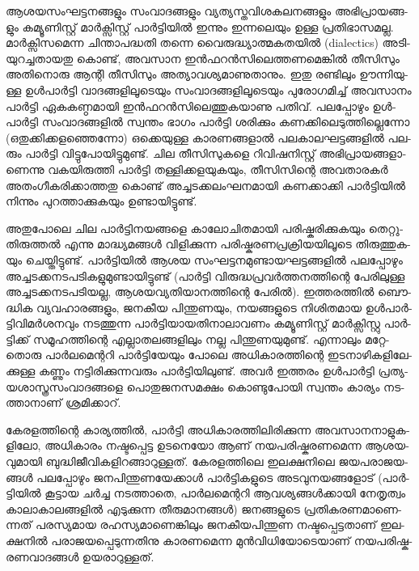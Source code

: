 \vskip 2pt

­ആ­ശ­യ­സം­ഘ­ട്ട­ന­ങ്ങ­ളും സം­വാ­ദ­ങ്ങ­ളും വ്യ­ത്യ­സ്ത­വി­ശ­ക­ല­ന­ങ്ങ­ളും അഭി­പ്രാ­യ­ങ്ങ­ളും കമ്യൂ­ണി­സ്റ്റ് മാര്‍­ക്സി­സ്റ്റ് പാര്‍­ട്ടി­യില്‍ 
ഇന്നും ഇന്ന­ലെ­യും ഉള്ള പ്ര­തി­ഭാ­സ­മ­ല്ല. മാര്‍­ക്സി­സ­മെ­ന്ന ചി­ന്താ­പ­ദ്ധ­തി തന്നെ വൈ­രു­ദ്ധ്യാ­ത്മ­ക­തയില്‍ (dialectics)­ 
അടി­യു­റ­ച്ച­താ­യ­തു കൊ­ണ്ട്, അവ­സാന ഇന്‍­ഫ­റന്‍­സി­ലെ­ത്ത­ണ­മെ­ങ്കില്‍ തീ­സി­സും അതി­നൊ­രു ആന്റി തീ­സി­സും 
അത്യാ­വ­ശ്യ­മാ­ണു­താ­നും. ഇതു രണ്ടി­ലും ഊന്നി­യു­ള്ള ഉള്‍­പാര്‍­ട്ടി വാ­ദ­ങ്ങ­ളി­ലൂ­ടെ­യും സം­വാ­ദ­ങ്ങ­ളി­ലൂ­ടെ­യും പു­രോ­ഗ­മി­ച്ച് 
അവ­സാ­നം പാര്‍­ട്ടി ഏക­ക­ണ്ഠ­മാ­യി ഇന്‍­ഫ­റന്‍­സി­ലെ­ത്തു­ക­യാ­ണു പതി­വ്. പല­പ്പോ­ഴും ഉള്‍­പാര്‍­ട്ടി സം­വാ­ദ­ങ്ങ­ളില്‍ സ്വ­ന്തം 
ഭാ­ഗം പാര്‍­ട്ടി ശരി­ക്കും കണ­ക്കി­ലെ­ടു­ത്തി­ല്ലെ­ന്നോ (ഒ­തു­ക്കി­ക്ക­ള­ഞ്ഞെ­ന്നോ) ഒക്കെ­യു­ള്ള കാ­ര­ണ­ങ്ങ­ളാല്‍ 
പല­കാ­ല­ഘ­ട്ട­ങ്ങ­ളില്‍ പല­രും പാര്‍­ട്ടി വി­ട്ടു­പോ­യി­ട്ടു­മു­ണ്ട്. ചില തീ­സി­സു­ക­ളെ റി­വി­ഷ­നി­സ്റ്റ് അഭി­പ്രാ­യ­ങ്ങ­ളാ­ണെ­ന്നു 
വക­യി­രു­ത്തി പാര്‍­ട്ടി തള്ളി­ക്ക­ള­യു­ക­യും, തീ­സി­സി­ന്റെ അവ­താ­ര­കര്‍ അതം­ഗീ­ക­രി­ക്കാ­ത്ത­തു കൊ­ണ്ട് 
അച്ച­ട­ക്ക­ലം­ഘ­ന­മാ­യി കണ­ക്കാ­ക്കി പാര്‍­ട്ടി­യില്‍ നി­ന്നും പു­റ­ത്താ­ക്കു­ക­യും ഉണ്ടാ­യി­ട്ടു­ണ്ട്.

അ­തു­പോ­ലെ ചില പാര്‍­ട്ടി­ന­യ­ങ്ങ­ളെ കാ­ലോ­ചി­ത­മാ­യി പരി­ഷ്ക­രി­ക്കു­ക­യും ­തെ­റ്റു­തി­രു­ത്തല്‍ എന്നു മാ­ദ്ധ്യ­മ­ങ്ങള്‍ വി­ളി­ക്കു­ന്ന 
പരി­ഷ്ക­ര­ണ­പ്ര­ക്രി­യ­യി­ലൂ­ടെ തി­രു­ത്തു­ക­യും ചെ­യ്തി­ട്ടു­ണ്ട്. പാര്‍­ട്ടി­യില്‍ ആശയ സം­ഘ­ട്ട­ന­മു­ണ്ടാ­യ­ഘ­ട്ട­ങ്ങ­ളില്‍ പല­പ്പോ­ഴും 
അച്ച­ട­ക്ക­ന­ട­പ­ടി­ക­ളു­മു­ണ്ടാ­യി­ട്ടു­ണ്ട് (പാര്‍­ട്ടി വി­രു­ദ്ധ­പ്ര­വര്‍­ത്ത­ന­ത്തി­ന്റെ പേ­രി­ലു­ള്ള അച്ച­ട­ക്ക­ന­ട­പ­ടി­യ­ല്ല, 
ആശ­യ­വ്യ­തി­യാ­ന­ത്തി­ന്റെ പേ­രില്‍). ഇത്ത­ര­ത്തില്‍ ബൌ­ദ്ധിക വ്യ­വ­ഹാ­ര­ങ്ങ­ളും, ജന­കീയ പി­ന്തു­ണ­യും, നയ­ങ്ങ­ളു­ടെ 
നി­ശി­ത­മായ ഉള്‍­പാര്‍­ട്ടി­വി­മര്‍­ശ­ന­വും നട­ത്തു­ന്ന പാര്‍­ട്ടി­യാ­യ­തി­നാ­ലാ­വ­ണം കമ്യൂ­ണി­സ്റ്റ് മാര്‍­ക്സി­സ്റ്റു പാര്‍­ട്ടി­ക്ക് 
സമൂ­ഹ­ത്തി­ന്റെ എല്ലാ­ത­ല­ങ്ങ­ളി­ലും നല്ല പി­ന്തു­ണ­യു­മു­ണ്ട്. എന്നാ­ലും മറ്റേ­തൊ­രു പാര്‍­ല­മെ­ന്റ­റി പാര്‍­ട്ടി­യേ­യും പോ­ലെ 
അധി­കാ­ര­ത്തി­ന്റെ ഇട­നാ­ഴി­ക­ളി­ലേ­ക്കു­ള്ള കണ്ണും നട്ടി­രി­ക്കു­ന്ന­വ­രും പാര്‍­ട്ടി­യി­ലു­ണ്ട്. അവര്‍ ഇത്ത­രം ഉള്‍­പാര്‍­ട്ടി 
പ്ര­ത്യ­യ­ശാ­സ്ത്ര­സം­വാ­ദ­ങ്ങ­ളെ പൊ­തു­ജ­ന­സ­മ­ക്ഷം കൊ­ണ്ടു­പോ­യി സ്വ­ന്തം കാ­ര്യം നട­ത്താ­നാ­ണ് ശ്ര­മി­ക്കാ­റ്.

­കേ­ര­ള­ത്തി­ന്റെ കാ­ര്യ­ത്തില്‍, പാര്‍­ട്ടി അധി­കാ­ര­ത്തി­ലി­രി­ക്കു­ന്ന അവ­സാ­ന­നാ­ളു­ക­ളി­ലോ, അധി­കാ­രം നഷ്ട­പ്പെ­ട്ട 
ഉട­നെ­യോ ആണ് നയ­പ­രി­ഷ്ക­ര­ണ­മെ­ന്ന ആശ­യ­വു­മാ­യി ബു­ദ്ധി­ജീ­വി­ക­ളി­റ­ങ്ങാ­റു­ള്ള­ത്. കേ­ര­ള­ത്തി­ലെ ഇല­ക്ഷ­നി­ലെ 
ജയ­പ­രാ­ജ­യ­ങ്ങള്‍ പല­പ്പോ­ഴും ജന­പി­ന്തു­ണ­യേ­ക്കാള്‍ പാര്‍­ട്ടി­ക­ളു­ടെ അട­വു­ന­യ­ങ്ങ­ളോ­ട് (പാര്‍­ട്ടി­യില്‍ കൂ­ട്ടായ ചര്‍­ച്ച 
നട­ത്താ­തെ, പാര്‍­ല­മെ­ന്റ­റി ആവ­ശ്യ­ങ്ങള്‍­ക്കാ­യി നേ­തൃ­ത്വം കാ­ലാ­കാ­ല­ങ്ങ­ളില്‍ എടു­ക്കു­ന്ന തീ­രു­മാ­ന­ങ്ങള്‍) ജന­ങ്ങ­ളു­ടെ 
പ്ര­തി­ക­ര­ണ­മാ­ണെ­ന്ന­ത് പര­സ്യ­മായ രഹ­സ്യ­മാ­ണെ­ങ്കി­ലും ജന­കീ­യ­പി­ന്തുണ നഷ്ട­പ്പെ­ട്ട­താ­ണ് ഇല­ക്ഷ­നില്‍ 
പരാ­ജ­യ­പ്പെ­ടു­ന്ന­തി­നു കാ­ര­ണ­മെ­ന്ന മുന്‍­വി­ധി­യോ­ടെ­യാ­ണ് നയ­പ­രി­ഷ്ക­ര­ണ­വാ­ദ­ങ്ങള്‍ ഉയ­രാ­റു­ള്ള­ത്.

